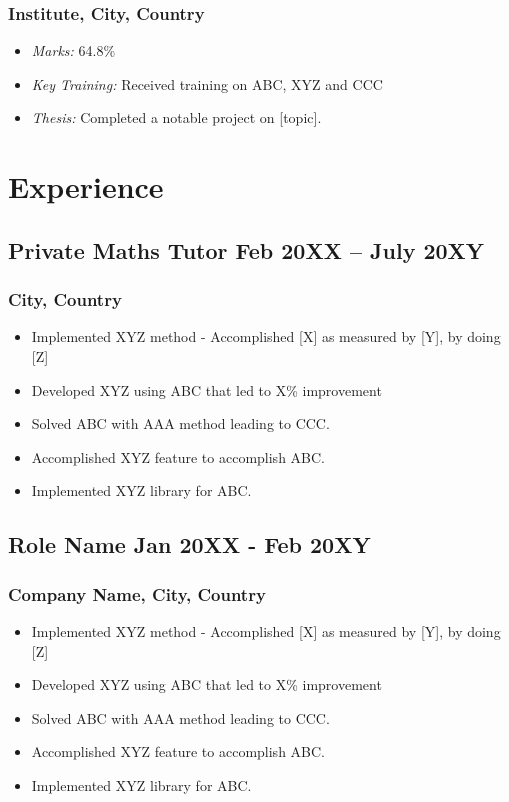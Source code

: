 \documentclass[11pt]{article}
\begin{document}
    \subsubsection{Institute,  City, Country }
    \begin{itemize}
        \item[\checkmark] \textit{Marks:} 64.8\% %
        \item[\checkmark] \textit{Key Training:} Received training on ABC, XYZ and CCC
        \item[\checkmark] \textit{Thesis:} Completed a notable project on [topic].
    \end{itemize}

    \section{Experience}

    \subsection{Private Maths Tutor \hfill \normalfont Feb 20XX -- July 20XY}
    \subsubsection{City, Country}
    \begin{itemize}
        \item[\checkmark] Implemented XYZ method - Accomplished [X] as measured by [Y], by doing [Z] 
        \item[\checkmark]  Developed XYZ using ABC that led to X\% improvement 
        \item[\checkmark] Solved ABC with AAA method leading to CCC.
        \item[\checkmark]  Accomplished XYZ feature to accomplish ABC.
        \item[\checkmark]  Implemented XYZ library for ABC.
    \end{itemize}
    
    \subsection{Role Name \hfill \normalfont Jan 20XX - Feb 20XY}
    \subsubsection{Company Name, City, Country}
    \begin{itemize}
        \item[\checkmark] Implemented XYZ method - Accomplished [X] as measured by [Y], by doing [Z] 
        \item[\checkmark]  Developed XYZ using ABC that led to X\% improvement 
        \item[\checkmark] Solved ABC with AAA method leading to CCC.
        \item[\checkmark]  Accomplished XYZ feature to accomplish ABC.
        \item[\checkmark]  Implemented XYZ library for ABC.
    \end{itemize}
\end{document}
